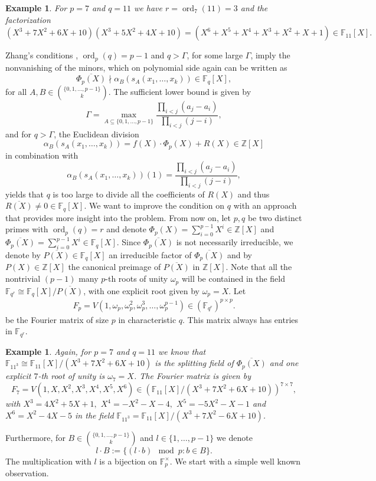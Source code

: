 \documentclass[a4paper]{article}
\renewcommand{\o}{\omega}
\newcommand{\Z}{\ensuremath{\mathbb{Z}}}
\newcommand{\F}{\mathbb{F}}
\newcommand{\ord}{\operatorname{ord}}
\newtheorem{example}[theorem]{Example}
\numberwithin{equation}{section}
\numberwithin{table}{section}
\numberwithin{figure}{section}
\begin{document}
\begin{example}
  For $p=7$ and $q=11$ we have $r=\ord_7(11)=3$ and the factorization
\[
(X^3+7X^2+6X+10)(X^3+5X^2+4X+10)=(X^6+X^5+X^4+X^3+X^2+X+1) \in \F_{11}[X].
\]
\end{example}
Zhang's conditions \cite{Zhang}, $\ord_p(q)=p-1$ and  $q > \Gamma$, for some large $\Gamma$, imply the nonvanishing of the minors, which on polynomial side again can be written as
\[
\overline{\Phi_p(X)} \nmid \alpha_B(s_A(x_1,\ldots,x_k)) \in \F_q[X],
\]
for all $A,B \in \binom{\{0,1,\ldots,p-1\}}{k}$. The sufficient lower bound is given by
\[
\Gamma = \max_{A \subseteq \{0,1,\ldots,p-1\}} \frac{\prod_{i < j}(a_j-a_i)}{\prod_{i < j}(j-i)},
\]
and for $q > \Gamma$, the Euclidean division
\[
\alpha_B(s_A(x_1,\ldots,x_k)) = f(X) \cdot\Phi_p(X) + R(X) \in \Z[X]
\]
in combination with
\[
\alpha_B(s_A(x_1,\ldots,x_k))(1)=\frac{\prod_{i < j}(a_j-a_i)}{\prod_{i < j}(j-i)},
\]
yields that $q$ is too large to divide all the coefficients of $R(X)$ and thus $\overline{R(X)} \neq 0 \in \F_q[X]$. We want to improve the condition on $q$ with an approach that provides more insight into the problem. From now on, let $p,q$ be two distinct primes with $\ord_p(q)=r$ and denote $\Phi_p(X)=\sum_{i=0}^{p-1}X^i \in \Z[X]$ and $\overline{\Phi_p(X)}=\sum_{i=0}^{p-1}X^i \in \F_q[X]$. Since $\overline{\Phi_p(X)}$ is not necessarily irreducible, we denote by $\overline{P(X)} \in \F_q[X]$ an irreducible factor of $\overline{\Phi_p(X)}$ and by $P(X) \in \Z[X]$ the canonical preimage of $\overline{P(X)}$ in $\Z[X]$. Note that all the nontrivial $(p-1)$ many $p$-th roots of unity $\o_p$ will be contained in the field $\F_{q^r} \cong \F_q[X]/\overline{P(X)}$, with one explicit root given by $\omega_p=X$. Let
\begin{align}\label{def:FourierFiniteField}
F_p=V(1,\o_p,\o_p^2,\o_p^3,\ldots,\o_p^{p-1}) \in \left(\F_{q^r}\right)^{p \times p}.
\end{align}
be the Fourier matrix of size $p$ in characteristic $q$. This matrix always has entries in $\F_{q^r}$. 
\begin{example}
Again, for $p=7$ and $q=11$ we know that $\F_{11^3}\cong \F_{11}[X]/(X^3+7X^2+6X+10)$ is the splitting field of $\overline{\Phi_p(X)}$ and one explicit $7$-th root of unity is $\o_7=X$. The Fourier matrix is given by
\[
F_7=V(1,X,X^2,X^3,X^4,X^5,X^6) \in (\F_{11}[X]/(X^3+7X^2+6X+10))^{7 \times 7},
\]
with $X^3=4X^2+5X+1,$ $X^4=-X^2-X-4,$ $X^5=-5X^2-X-1$ and $X^6=X^2-4X-5$ in the field $\F_{11^3}=\F_{11}[X]/(X^3+7X^2-6X+10)$.    
\end{example}
Furthermore, for $B \in \binom{\{0,1,\ldots,p-1\}}{k}$ and $l \in \{1,\ldots,p-1\}$ we denote \[l \cdot B := \{ (l \cdot b) \mod p \colon b \in B\}.\]
The multiplication with $l$ is a bijection on $\F_p^\times$.
We start with a simple well known observation. 
\end{document}
